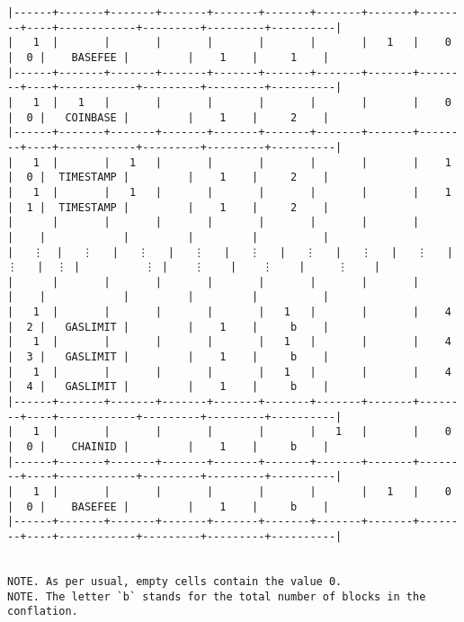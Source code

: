 \documentclass[varwidth=\maxdimen,margin=0.5cm,multi={verbatim}]{standalone}
\begin{document}
\begin{verbatim}
|------+-------+-------+-------+-------+-------+-------+-------+--------+----+------------+---------+---------+----------|
|   1  |       |       |       |       |       |       |   1   |    0   |  0 |    BASEFEE |         |    1    |     1    |
|------+-------+-------+-------+-------+-------+-------+-------+--------+----+------------+---------+---------+----------|
|   1  |   1   |       |       |       |       |       |       |    0   |  0 |   COINBASE |         |    1    |     2    |
|------+-------+-------+-------+-------+-------+-------+-------+--------+----+------------+---------+---------+----------|
|   1  |       |   1   |       |       |       |       |       |    1   |  0 |  TIMESTAMP |         |    1    |     2    |
|   1  |       |   1   |       |       |       |       |       |    1   |  1 |  TIMESTAMP |         |    1    |     2    |
|      |       |       |       |       |       |       |       |        |    |            |         |         |          |
|   ⋮  |   ⋮   |   ⋮   |   ⋮   |   ⋮   |   ⋮   |   ⋮   |   ⋮   |    ⋮   |  ⋮ |          ⋮ |    ⋮    |    ⋮    |     ⋮    |
|      |       |       |       |       |       |       |       |        |    |            |         |         |          |
|   1  |       |       |       |       |   1   |       |       |    4   |  2 |   GASLIMIT |         |    1    |     b    |
|   1  |       |       |       |       |   1   |       |       |    4   |  3 |   GASLIMIT |         |    1    |     b    |
|   1  |       |       |       |       |   1   |       |       |    4   |  4 |   GASLIMIT |         |    1    |     b    |
|------+-------+-------+-------+-------+-------+-------+-------+--------+----+------------+---------+---------+----------|
|   1  |       |       |       |       |       |   1   |       |    0   |  0 |    CHAINID |         |    1    |     b    |
|------+-------+-------+-------+-------+-------+-------+-------+--------+----+------------+---------+---------+----------|
|   1  |       |       |       |       |       |       |   1   |    0   |  0 |    BASEFEE |         |    1    |     b    |
|------+-------+-------+-------+-------+-------+-------+-------+--------+----+------------+---------+---------+----------|


NOTE. As per usual, empty cells contain the value 0.
NOTE. The letter `b` stands for the total number of blocks in the conflation.

\end{verbatim}
\end{document}
